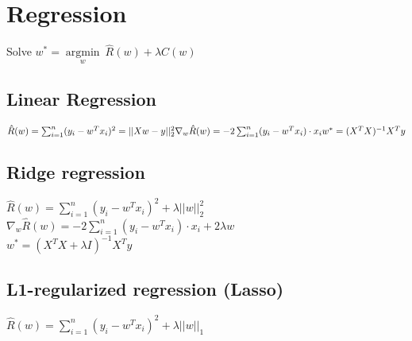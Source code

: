 
\section*{Regression}

Solve $w^* = \underset{w}{\operatorname{argmin}} ~ \hat{R}(w)+ \lambda C(w)$

\subsection*{Linear Regression}

$\hat{R}(w) = \sum_{i=1}^n (y_i - w^Tx_i)^2 = ||Xw-y||^2_2\\
\nabla_w \hat{R}(w) = -2 \sum_{i=1}^n (y_i-w^T x_i) \cdot x_i \\
w^* = (X^T X)^{-1} X^T y$


\subsection*{Ridge regression}

$\hat{R}(w) = \sum_{i=1}^n (y_i - w^Tx_i)^2 + \lambda ||w||_2^2$\\
$\nabla_w \hat{R}(w) = -2 \sum_{i=1}^n (y_i-w^T x_i) \cdot x_i + 2 \lambda w$\\
$w^*=(X^T X + \lambda I)^{-1} X^T y$

\subsection*{L1-regularized regression (Lasso)}
$\hat{R}(w) = \sum_{i=1}^n (y_i - w^Tx_i)^2 + \lambda ||w||_1$